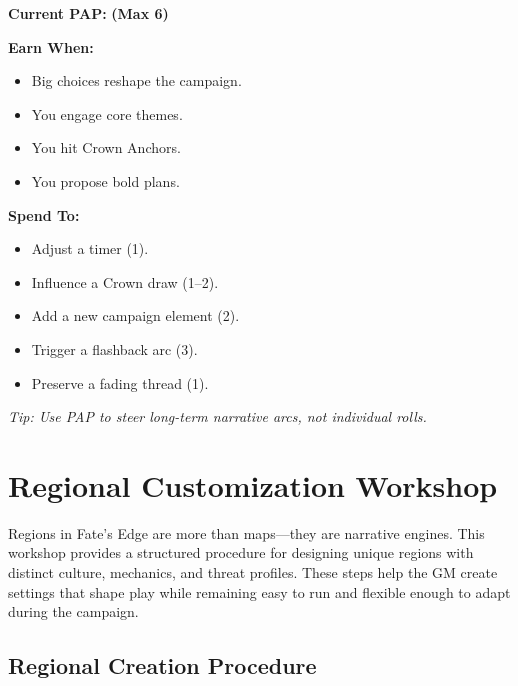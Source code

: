 \documentclass[11pt]{article}
\begin{document}
\begin{tcolorbox}[
  title=\textbf{Agency Points (Quick Reference)},
  colback=gray!10,
  colframe=black,
  fonttitle=\bfseries,
  left=6pt,
  right=6pt,
  top=6pt,
  bottom=6pt,
  enhanced,
  sharp corners
,breakable]

\textbf{Current PAP:} \underline{\phantom{XX}} \quad \textbf{(Max 6)}

\medskip

\textbf{Earn When:}
\begin{itemize}[leftmargin=1.2em]
  \item Big choices reshape the campaign.
  \item You engage core themes.
  \item You hit Crown Anchors.
  \item You propose bold plans.
\end{itemize}

\medskip

\textbf{Spend To:}
\begin{itemize}[leftmargin=1.2em]
  \item Adjust a timer (1).
  \item Influence a Crown draw (1--2).
  \item Add a new campaign element (2).
  \item Trigger a flashback arc (3).
  \item Preserve a fading thread (1).
\end{itemize}

\medskip

\textit{Tip: Use PAP to steer long-term narrative arcs, not individual rolls.}

\end{tcolorbox}

\section{Regional Customization Workshop}
\label{sec:regional-customization}

Regions in Fate's Edge are more than maps---they are narrative engines. This workshop provides 
a structured procedure for designing unique regions with distinct culture, mechanics, and 
threat profiles. These steps help the GM create settings that shape play while remaining easy 
to run and flexible enough to adapt during the campaign.

\subsection{Regional Creation Procedure}
\end{document}
